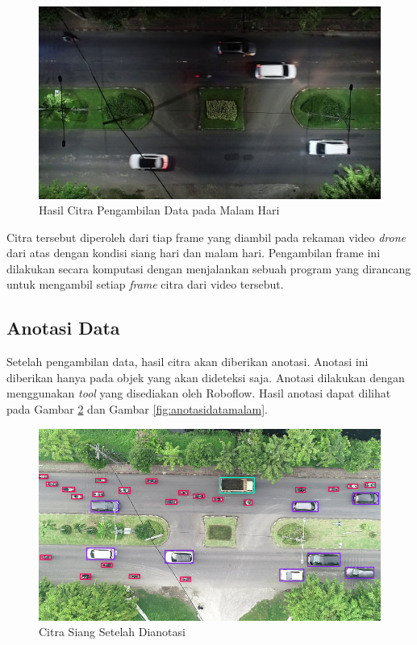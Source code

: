 \begin{figure} [H] \centering
  \includegraphics[scale=0.225]{bab3/citramalam.jpg}
  \caption{Hasil Citra Pengambilan Data pada Malam Hari}
  \label{fig:datacitra_malam}
\end{figure}

Citra tersebut diperoleh dari tiap frame yang diambil pada rekaman video \emph{drone} dari atas dengan kondisi siang hari dan malam hari. Pengambilan frame ini dilakukan secara komputasi dengan menjalankan sebuah program yang dirancang untuk mengambil setiap \emph{frame} citra dari video tersebut.

\subsection{Anotasi Data}
Setelah pengambilan data, hasil citra akan diberikan anotasi. Anotasi ini diberikan hanya pada objek yang akan dideteksi saja. Anotasi dilakukan dengan menggunakan \emph{tool} yang disediakan oleh Roboflow. Hasil anotasi dapat dilihat pada Gambar \ref{fig:anotasidatasiang} dan Gambar \ref{fig:anotasidatamalam}.

\begin{figure} [H] \centering
  \includegraphics[scale=0.5]{bab3/anotasidatasiang.png}
  \caption{Citra Siang Setelah Dianotasi}
  \label{fig:anotasidatasiang}
\end{figure}

